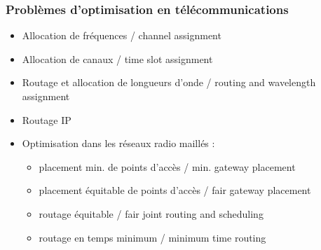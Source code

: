 \begin{frame}
  \frametitle{Problèmes d'optimisation en télécommunications}

  \begin{itemize}
  \item Allocation de fréquences / channel assignment
  \item Allocation de canaux / time slot assignment
  \item Routage et allocation de longueurs d'onde / routing and wavelength assignment
  \item Routage IP
  \item Optimisation dans les réseaux radio maillés :
    \begin{itemize}
    \item placement min. de points d'accès / min. gateway placement
    \item placement équitable de points d'accès / fair gateway placement
    \item routage équitable / fair joint routing and scheduling
    \item routage en temps minimum / minimum time routing
    \end{itemize}
  \end{itemize}
  
\end{frame}

